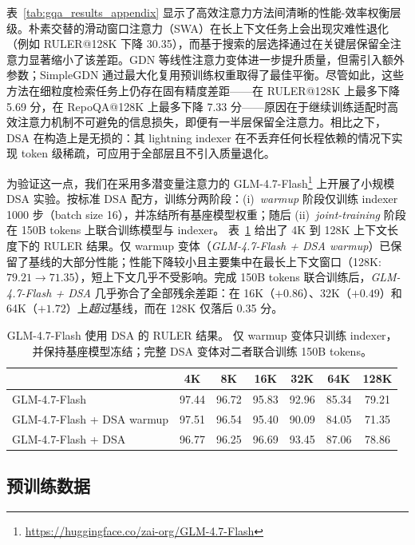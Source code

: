 表~\ref{tab:gqa_results_appendix} 显示了高效注意力方法间清晰的性能-效率权衡层级。朴素交替的滑动窗口注意力（SWA）在长上下文任务上会出现灾难性退化（例如 RULER@128K 下降 30.35），而基于搜索的层选择通过在关键层保留全注意力显著缩小了该差距。GDN 等线性注意力变体进一步提升质量，但需引入额外参数；SimpleGDN 通过最大化复用预训练权重取得了最佳平衡。尽管如此，这些方法在细粒度检索任务上仍存在固有精度差距——在 RULER@128K 上最多下降 5.69 分，在 RepoQA@128K 上最多下降 7.33 分——原因在于继续训练适配时高效注意力机制不可避免的信息损失，即便有一半层保留全注意力。相比之下，DSA 在构造上是无损的：其 lightning indexer 在不丢弃任何长程依赖的情况下实现 token 级稀疏，可应用于全部层且不引入质量退化。


为验证这一点，我们在采用多潜变量注意力的 GLM-4.7-Flash\footnote{\url{https://huggingface.co/zai-org/GLM-4.7-Flash}} 上开展了小规模 DSA 实验。按标准 DSA 配方，训练分两阶段：(i)~\textit{warmup} 阶段仅训练 indexer 1000 步（batch size 16），并冻结所有基座模型权重；随后 (ii)~\textit{joint-training} 阶段在 150B tokens 上联合训练模型与 indexer。
表~\ref{tab:dsa_ruler_results} 给出了 4K 到 128K 上下文长度下的 RULER 结果。仅 warmup 变体（\textit{GLM-4.7-Flash + DSA warmup}）已保留了基线的大部分性能；性能下降较小且主要集中在最长上下文窗口（128K: $79.21 \to 71.35$），短上下文几乎不受影响。完成 150B tokens 联合训练后，\textit{GLM-4.7-Flash + DSA} 几乎弥合了全部残余差距：在 16K（$+0.86$）、32K（$+0.49$）和 64K（$+1.72$）上\textit{超过}基线，而在 128K 仅落后 0.35 分。

\begin{table}[t]
    \small
    \centering
    \caption{GLM-4.7-Flash 使用 DSA 的 RULER 结果。
    仅 warmup 变体只训练 indexer，
    并保持基座模型冻结；完整 DSA 变体对二者联合训练
    150B tokens。 }
   \label{tab:dsa_ruler_results}
    \begin{tabular}{lcccccc}
        \toprule
         & {4K} & {8K} & {16K} & {32K} & {64K} & {128K} \\
        \midrule
        GLM-4.7-Flash  & 97.44 & 96.72 & 95.83 & 92.96 & 85.34 & 79.21 \\
        GLM-4.7-Flash + DSA warmup & 97.51 & 96.54 & 95.40 & 90.09 & 84.05 & 71.35  \\
        GLM-4.7-Flash + DSA & 96.77 & 96.25 & 96.69 & 93.45 & 87.06 & 78.86 \\
        \bottomrule
    \end{tabular}
\end{table}



\subsection{预训练数据}

